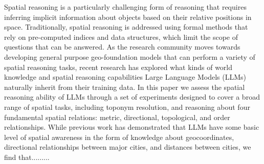 
Spatial reasoning is a particularly challenging form of reasoning that requires inferring implicit information about objects based on their relative positions in space.
Traditionally, spatial reasoning is addressed using formal methods that rely on pre-computed indices and data structures, which limit the scope of questions that can be answered.
As the research community moves towards developing general purpose geo-foundation models that can perform a variety of spatial reasoning tasks, recent research has explored what kinds of world knowledge and spatial reasoning capabilities Large Language Models (LLMs) naturally inherit from their training data.
In this paper we assess the spatial reasoning ability of LLMs through a set of experiments designed to cover a broad range of spatial tasks, including toponym resolution, and reasoning about four fundamental spatial relations: metric, directional, topological, and order relationships.
While previous work has demonstrated that LLMs  have some basic level of spatial awareness in the form of knowledge about geocoordinates, directional relationships between major cities, and distances between cities, we find that.........





